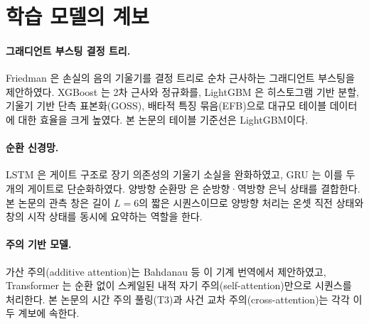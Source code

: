 
\section{학습 모델의 계보}
\label{sec:bg-models}

\paragraph{그래디언트 부스팅 결정 트리.} Friedman \cite{friedman2001greedy}은 손실의 음의 기울기를 결정 트리로 순차 근사하는 그래디언트 부스팅을 제안하였다. XGBoost \cite{chen2016xgboost}는 2차 근사와 정규화를, LightGBM \cite{ke2017lightgbm}은 히스토그램 기반 분할, 기울기 기반 단측 표본화(GOSS), 배타적 특징 묶음(EFB)으로 대규모 테이블 데이터에 대한 효율을 크게 높였다. 본 논문의 테이블 기준선은 LightGBM이다.

\paragraph{순환 신경망.} LSTM \cite{hochreiter1997long}은 게이트 구조로 장기 의존성의 기울기 소실을 완화하였고, GRU \cite{cho2014learning}는 이를 두 개의 게이트로 단순화하였다. 양방향 순환망 \cite{schuster1997bidirectional}은 순방향·역방향 은닉 상태를 결합한다. 본 논문의 관측 창은 길이 $L=6$의 짧은 시퀀스이므로 양방향 처리는 온셋 직전 상태와 창의 시작 상태를 동시에 요약하는 역할을 한다.

\paragraph{주의 기반 모델.} 가산 주의(additive attention)는 Bahdanau 등 \cite{bahdanau2015neural}이 기계 번역에서 제안하였고, Transformer \cite{vaswani2017attention}는 순환 없이 스케일된 내적 자기 주의(self-attention)만으로 시퀀스를 처리한다. 본 논문의 시간 주의 풀링(T3)과 사건 교차 주의(cross-attention)는 각각 이 두 계보에 속한다.

